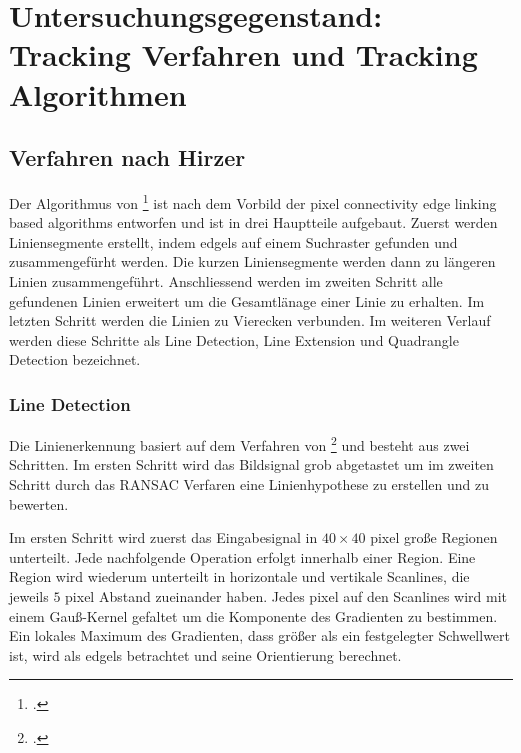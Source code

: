 \section{Untersuchungsgegenstand: Tracking Verfahren und Tracking Algorithmen} %
\label{sec:untersuchungsgegenstand}
\begin{comment}
	Untersuchungsgegenstand: Verfahren und Algorithmen präzise vorstellen und ihre Unterschiede hervorheben.
	Notwendige Kriterien der Algorithmen bestimmen

	Grober Ablauf der Verfahren:
	* Wer hats erfunden?
	* Wie ist das Verfahren aufgebaut (Algo in grob)
	* Welche Kriterien müssen erfüllt sein (monochrome, rgb eingabe)?
\end{comment}

\subsection{Verfahren nach Hirzer} %
\label{sub:verfahren_nach_hirzer}

Der Algorithmus von \citeauthor{hirzer08}\footcite{hirzer08} ist nach dem Vorbild der pixel connectivity edge linking based algorithms entworfen und ist in drei Hauptteile aufgebaut. Zuerst werden Liniensegmente erstellt, indem \gls{edgels} auf einem Suchraster gefunden und zusammengefürht werden. Die kurzen Liniensegmente werden dann zu längeren Linien zusammengeführt. Anschliessend werden im zweiten Schritt alle gefundenen Linien erweitert um die Gesamtlänage einer Linie zu erhalten. Im letzten Schritt werden die Linien zu Vierecken verbunden. Im weiteren Verlauf werden diese Schritte als Line Detection, Line Extension und Quadrangle Detection bezeichnet.

\subsubsection{Line Detection} %
\label{sub:line_detection}
Die Linienerkennung basiert auf dem Verfahren von \citeauthor{clarke96}\footcite{clarke96} und besteht aus zwei Schritten. Im ersten Schritt wird das Bildsignal grob abgetastet um im zweiten Schritt durch das RANSAC Verfaren eine Linienhypothese zu erstellen und zu bewerten.

Im ersten Schritt wird zuerst das Eingabesignal in $40 \times 40$ \gls{pixel} große Regionen unterteilt. Jede nachfolgende Operation erfolgt innerhalb einer Region. Eine Region wird wiederum unterteilt in horizontale und vertikale Scanlines, die jeweils $5$ \gls{pixel} Abstand zueinander haben. Jedes \gls{pixel} auf den Scanlines wird mit einem Gauß-Kernel gefaltet um die Komponente des Gradienten zu bestimmen. Ein lokales Maximum des Gradienten, dass größer als ein festgelegter Schwellwert ist, wird als \gls{edgels} betrachtet und seine Orientierung berechnet.

